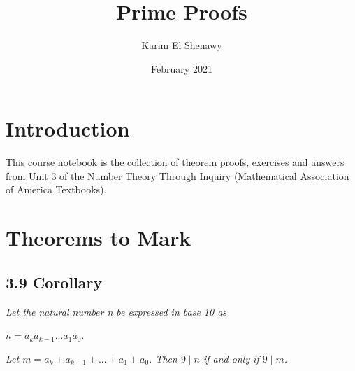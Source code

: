 \documentclass{article}
\title{Prime Proofs}
\author{Karim El Shenawy}
\date{February 2021}
\begin{document}
\maketitle

\section*{Introduction}
This course notebook is the collection of theorem proofs, exercises and answers from Unit 3 of the Number Theory Through Inquiry (Mathematical Association of America Textbooks).

\section*{Theorems to Mark}

\subsection*{3.9 Corollary} 
\quad \textit{Let the natural number n be expressed in base 10 as}
\begin{center}
    $n = a_ka_{k-1}...a_1a_0$.
\end{center}
\textit{Let $m = a_k + a_{k-1} + ... + a_1 + a_0$. Then $9 \mid n$ if and only if $9 \mid m$.}
\end{document}
